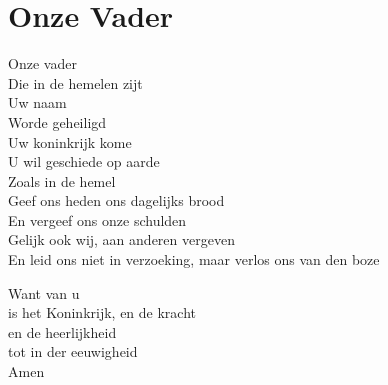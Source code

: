 \section{Onze Vader}
Onze vader\\
Die in de hemelen zijt\\
Uw naam\\
Worde geheiligd\\

Uw koninkrijk kome\\
U wil geschiede op aarde\\
Zoals in de hemel\\

Geef ons heden ons dagelijks brood\\
En vergeef ons onze schulden\\
Gelijk ook wij, aan anderen vergeven\\

En leid ons niet in verzoeking, maar verlos ons van den boze

Want van u\\
is het Koninkrijk, en de kracht\\
en de heerlijkheid\\
tot in der eeuwigheid\\
Amen